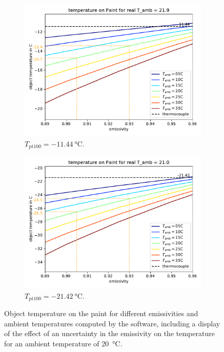 \begin{figure}[h!]
	\centering
	\begin{subfigure}{0.5\textwidth}
		\includegraphics[width=.8\textwidth]{img/softwarePaint-10.pdf}
		\caption{$T_\text{pt100} = \SI{-11.44}{\degreeCelsius}$.}
		\label{fig:softwarePaint-10}
	\end{subfigure}%
	\begin{subfigure}{0.5\textwidth}
		\includegraphics[width=.8\textwidth]{img/softwarePaint-20.pdf}
		\caption{$T_\text{pt100} = \SI{-21.42}{\degreeCelsius}$.}
		\label{fig:softwarePaint-20}
	\end{subfigure}
	\caption{Object temperature on the paint for different emissivities and ambient temperatures computed by the software, including a display of the effect of an uncertainty in the emissivity on the temperature for an ambient temperature of \SI{20}{\degreeCelsius}.}
	\label{fig:softwarePaint}
\end{figure} \\
\clearpage